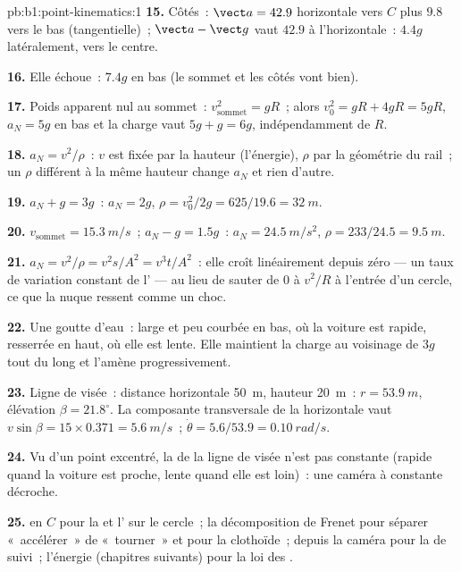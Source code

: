 \begin{solution}{pb:b1:point-kinematics:1}
\textbf{15.} Côtés~: $\vect a = 42.9$ horizontale vers $C$ plus $9.8$
vers le bas (tangentielle)~; $\vect a - \vect g$ vaut $42.9$ à
l'horizontale~: $4.4g$ latéralement, vers le centre.

\textbf{16.} Elle échoue~: $7.4g$ en bas (le sommet et les côtés vont bien).

\textbf{17.} Poids apparent nul au sommet~: $v_{\text{sommet}}^2 = gR$~;
alors $v_0^2 = gR + 4gR = 5gR$, $a_N = 5g$ en bas et la charge vaut
$5g + g = 6g$, indépendamment de $R$.

\textbf{18.} $a_N = v^2/\rho$~: $v$ est fixée par la hauteur (l'énergie),
$\rho$ par la géométrie du rail~; un $\rho$ différent à la même hauteur
change $a_N$ et rien d'autre.

\textbf{19.} $a_N + g = 3g$~: $a_N = 2g$, $\rho = v_0^2/2g = 625/19.6 =
\qty{32}{m}$.

\textbf{20.} $v_{\text{sommet}} = \qty{15.3}{m/s}$~; $a_N - g = 1.5g$~: $a_N =
\qty{24.5}{m/s^2}$, $\rho = 233/24.5 = \qty{9.5}{m}$.

\textbf{21.} $a_N = v^2/\rho = v^2s/A^2 = v^3t/A^2$~: elle croît
linéairement depuis zéro --- un taux de variation constant de
l' --- au lieu de sauter de $0$ à $v^2/R$ à l'entrée d'un
cercle, ce que la nuque ressent comme un choc.

\textbf{22.} Une goutte d'eau~: large et peu courbée en bas, où la
voiture est rapide, resserrée en haut, où elle est lente. Elle maintient
la charge au voisinage de $3g$ tout du long et l'amène progressivement.

\textbf{23.} Ligne de visée~: distance horizontale \qty{50}{m}, hauteur
\qty{20}{m}~: $r = \qty{53.9}{m}$, élévation $\beta = 21.8^\circ$. La
composante transversale de la  horizontale vaut $v\sin\beta = 15 \times
0.371 = \qty{5.6}{m/s}$~; $\dot\theta = 5.6/53.9 = \qty{0.10}{rad/s}$.

\textbf{24.} Vu d'un point excentré, la  de la ligne de
visée n'est pas constante (rapide quand la voiture est proche, lente
quand elle est loin)~: une caméra à  constante décroche.

\textbf{25.}  en $C$ pour la  et
l' sur le cercle~; la décomposition de Frenet pour séparer
«~accélérer~» de «~tourner~» et pour la clothoïde~; 
depuis la caméra pour la  de suivi~; l'énergie (chapitres
suivants) pour la loi des .
\end{solution}
